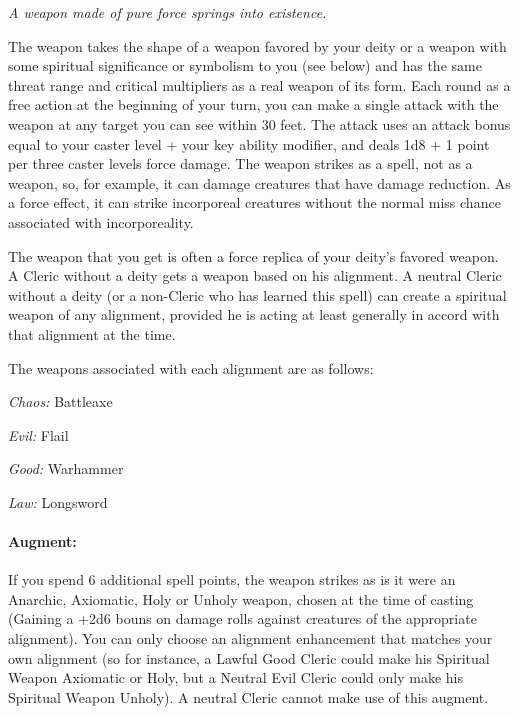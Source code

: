 \emph{A weapon made of pure force springs into existence.}

The weapon takes the shape of a weapon favored by your deity or a weapon with some spiritual significance or symbolism to you (see below) 
and has the same threat range and critical multipliers as a real weapon of its form. 
Each round as a free action at the beginning of your turn, you can make a single attack with the weapon at any target you can see within 30 feet.
The attack uses an attack bonus equal to your caster level + your key ability modifier,
and deals 1d8 + 1 point per three caster levels force damage.
The weapon strikes as a spell, not as a weapon, so, for example, it can damage creatures that have damage reduction.
As a force effect, it can strike incorporeal creatures without the normal miss chance associated with incorporeality.

The weapon that you get is often a force replica of your deity's favored weapon. 
A Cleric without a deity gets a weapon based on his alignment. 
A neutral Cleric without a deity (or a non-Cleric who has learned this spell) can create a spiritual weapon of any alignment, 
provided he is acting at least generally in accord with that alignment at the time. 

The weapons associated with each alignment are as follows: 
\begin{list}{}{\leftmargin=1em}
 \item \emph{Chaos:} Battleaxe
 \item \emph{Evil:} Flail
 \item \emph{Good:} Warhammer
 \item \emph{Law:} Longsword
\end{list}

\paragraph{Augment:} If you spend 6 additional spell points, the weapon strikes as is it were an Anarchic, Axiomatic, Holy or Unholy weapon, chosen at the time of casting
(Gaining a +2d6 bouns on damage rolls against creatures of the appropriate alignment).
You can only choose an alignment enhancement that matches your own alignment (so for instance, a Lawful Good Cleric could make his Spiritual Weapon Axiomatic or Holy,
but a Neutral Evil Cleric could only make his Spiritual Weapon Unholy).
A neutral Cleric cannot make use of this augment.



